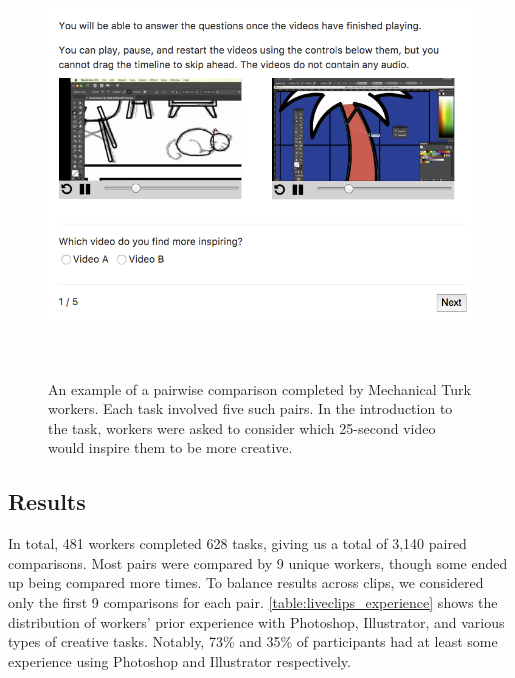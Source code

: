 \begin{figure}[t!]
\centering
  \includegraphics[width=0.8\columnwidth]{liveclips/figures/mturk.png}
  \caption{An example of a pairwise comparison completed by Mechanical Turk workers. Each task involved five such pairs. In the introduction to the task, workers were asked to consider which 25-second video would inspire them to be more creative. }~\label{fig:liveclips_mturk}
\end{figure}

\subsection{Results}
In total, 481 workers completed 628 tasks, giving us a total of 3,140 paired comparisons. Most pairs were compared by 9 unique workers, though some ended up being compared more times. To balance results across clips, we considered only the first 9 comparisons for each pair. \autoref{table:liveclips_experience} shows the distribution of workers' prior experience with Photoshop, Illustrator, and various types of creative tasks. Notably, 73\% and 35\% of participants had at least some experience using Photoshop and Illustrator respectively.

